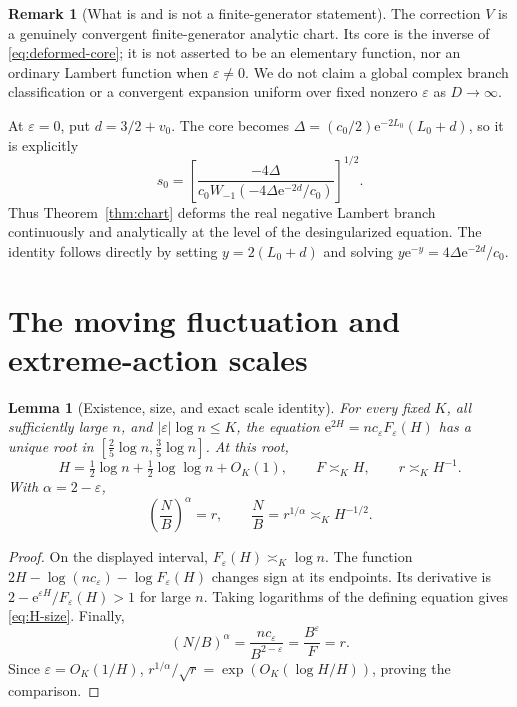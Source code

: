 \documentclass[11pt,a4paper]{article}
\numberwithin{equation}{section}
\newtheorem{lemma}[theorem]{Lemma}
\theoremstyle{definition}
\newtheorem{remark}[theorem]{Remark}
\theoremstyle{remark}
\newcommand{\eps}{\varepsilon}
\newcommand{\ee}{\mathrm e}
\newcommand{\FF}{F_{\eps}}
\begin{document}
\begin{remark}[What is and is not a finite-generator statement]
The correction \(V\) is a genuinely convergent finite-generator analytic
chart. Its core is the inverse of \eqref{eq:deformed-core}; it is not asserted
to be an elementary function, nor an ordinary Lambert function when
\(\eps\ne0\). We do not claim a global complex branch classification or a
convergent expansion uniform over fixed nonzero \(\eps\) as \(D\to\infty\).
\end{remark}

At \(\eps=0\), put \(d=3/2+v_0\). The core becomes
\(\Delta=(c_0/2)\ee^{-2L_0}(L_0+d)\), so it is explicitly
\begin{equation}
 s_0=\left[
 \frac{-4\Delta}
 {c_0 W_{-1}(-4\Delta\ee^{-2d}/c_0)}\right]^{1/2}.
 \label{eq:lambert-core}
\end{equation}
Thus Theorem~\ref{thm:chart} deforms the real negative Lambert branch
continuously and analytically at the level of the desingularized equation.
The identity follows directly by setting \(y=2(L_0+d)\) and solving
\(y\ee^{-y}=4\Delta\ee^{-2d}/c_0\).

\section{The moving fluctuation and extreme-action scales}
\label{sec:scales}

\begin{lemma}[Existence, size, and exact scale identity]
\label{lem:scales}
For every fixed \(K\), all sufficiently large \(n\), and
\(|\eps|\log n\le K\), the equation
\(\ee^{2H}=nc_{\eps}\FF(H)\) has a unique root in
\([\tfrac25\log n,\tfrac35\log n]\). At this root,
\begin{equation}
 H=\tfrac12\log n+\tfrac12\log\log n+O_K(1),\qquad
 F\asymp_K H,\qquad r\asymp_K H^{-1}.
 \label{eq:H-size}
\end{equation}
With \(\alpha=2-\eps\),
\begin{equation}
 \left(\frac NB\right)^{\alpha}=r,
 \qquad \frac NB=r^{1/\alpha}\asymp_K H^{-1/2}.
 \label{eq:N-B-identity}
\end{equation}
\end{lemma}
\begin{proof}
On the displayed interval, \(\FF(H)\asymp_K\log n\). The function
\(2H-\log(nc_{\eps})-\log\FF(H)\) changes sign at its endpoints.
Its derivative is \(2-\ee^{\eps H}/\FF(H)>1\) for large \(n\).
Taking logarithms of the defining equation gives \eqref{eq:H-size}.
Finally,
\[
 (N/B)^{\alpha}=\frac{nc_{\eps}}{B^{2-\eps}}
 =\frac{B^{\eps}}F=r.
\]
Since \(\eps=O_K(1/H)\),
\(r^{1/\alpha}/\sqrt r=\exp(O_K(\log H/H))\), proving the comparison.
\end{proof}
\end{document}
